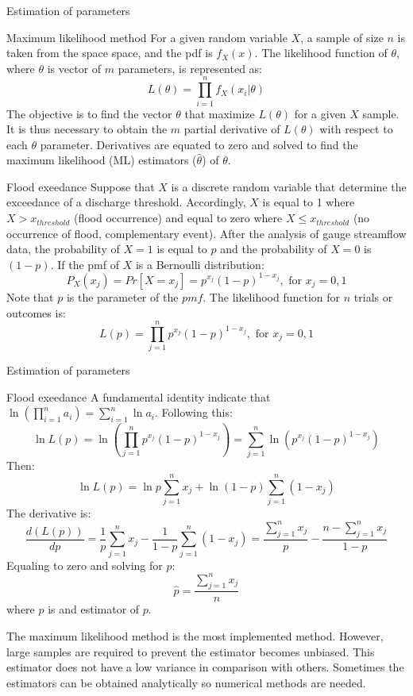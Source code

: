 \documentclass[8pt]{beamer}
\renewcommand{\emph}[1]{\textcolor{myorange}{#1}}
\begin{document}
\begin{frame}{Estimation of parameters}
    \begin{block}{Maximum likelihood method}
        For a given random variable $X$, a sample of size $n$ is taken from the  space space, and the \emph{pdf} is $f_X (x)$. The \alert{likelihood function} of $\theta$, where $\theta$ is vector of $m$ parameters, is represented as:
        \[
            L (\theta) = \prod_{i=1}^n f_X (x_i | \theta )
        \]
        The objective is to  find the vector $\theta$ that maximize $L(\theta)$ for a given $X$ sample. It is thus necessary to obtain the $m$ partial derivative of $L(\theta)$ with respect to each $\theta$ parameter. Derivatives are equated to zero and solved  to find the \alert{maximum likelihood (ML)} estimators ($\hat{\theta}$) of $\theta$.  
    \end{block}

    \begin{exampleblock}{Flood exeedance}
        Suppose that $X$ is a discrete random variable that determine the exceedance of a discharge threshold. Accordingly, $X$ is equal to 1 where $X > x_{threshold}$ (flood occurrence) and equal to zero where $X \leq x_{threshold}$ (no occurrence of flood, complementary event). After the analysis of gauge streamflow data, the probability of $X = 1$ is equal to $p$ and the probability of $X = 0$ is $(1-p)$. If the \emph{pmf} of $X$ is a \emph{Bernoulli distribution}:
        \[
            P_X (x_j) = Pr [X = x_j] = p^{x_j} (1-p)^{1-x_j}, \text{ for } x_j = 0, 1
        \]
        Note that $p$ is the parameter of the $pmf$. The \emph{likelihood function} for $n$ trials or outcomes is:
        \[
            L (p) = \prod_{j=1}^n p^{x_j} (1-p)^{1-x_j}, \text{ for } x_j = 0, 1
        \]
    \end{exampleblock}
\end{frame}

\begin{frame}{Estimation of parameters}
    \begin{exampleblock}{Flood exeedance}
        A fundamental identity indicate that $\ln \left( \prod_{i=1}^n a_i \right) = \sum_{i=1}^n \ln a_i$. Following this:
        \[
            \ln L (p) = \ln \left( \prod_{j=1}^n p^{x_j} (1-p)^{1-x_j} \right) = \sum_{j=1}^n \ln \left( p^{x_j} (1-p)^{1-x_j} \right) 
        \]
        Then:
        \[
            \ln L (p) = \ln p \sum_{j=1}^n x_j  +  \ln (1-p)\sum_{j=1}^n (1-x_j)
        \]
        The derivative is:
        \[
            \frac{d \left( L (p) \right)}{dp} = \frac{1}{p} \sum_{j=1}^n x_j - \frac{1}{1-p}\sum_{j=1}^n (1-x_j) = \frac{\sum_{j=1}^n x_j}{p} - \frac{n - \sum_{j=1}^n x_j}{1-p}
        \]
        Equaling to zero and solving for $p$:
        \[
            \hat{p} = \frac{\sum_{j=1}^n x_j}{n}
        \]
        where $\hat{p}$ is and estimator of $p$. 
    \end{exampleblock}
    The \emph{maximum likelihood method} is the most implemented method. However, large samples are required to prevent the estimator becomes unbiased. This estimator does not have a low variance in comparison with others. Sometimes the estimators can be obtained analytically so numerical methods are needed.
\end{frame}
\end{document}
